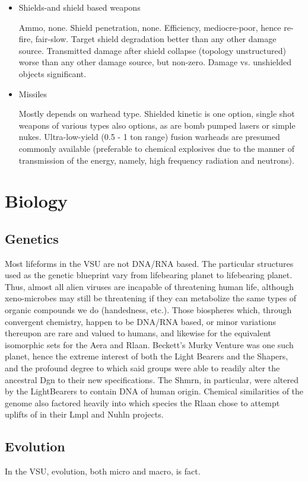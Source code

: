 \begin{itemize}
\item Shields-and shield based weapons

Ammo, none. Shield penetration, none. Efficiency, mediocre-poor, hence
re-fire, fair-slow. Target shield degradation better than any other
damage source. Transmitted damage after shield collapse (topology
unstructured) worse than any other damage source, but non-zero. Damage
vs. unshielded objects significant.

\item Missiles

Mostly depends on warhead type. Shielded kinetic is one option, single
shot weapons of various types also options, as are bomb pumped lasers
or simple nukes. Ultra-low-yield (0.5 - 1 ton range) fusion warheads
are presumed commonly available (preferable to chemical explosives due
to the manner of transmission of the energy, namely, high frequency
radiation and neutrons).
\end{itemize}

\section{Biology}
\label{sec:VSBiology}
\subsection{Genetics}
Most lifeforms in the VSU are not DNA/RNA based. The particular
structures used as the genetic blueprint vary from lifebearing planet
to lifebearing planet. Thus, almost all alien viruses are incapable of
threatening human life, although xeno-microbes may still be
threatening if they can metabolize the same types of organic compounds
we do (handedness, etc.). Those biospheres which, through convergent
chemistry, happen to be DNA/RNA based, or minor variations thereupon
are rare and valued to humans, and likewise for the equivalent
isomorphic sets for the Aera and Rlaan. Beckett's Murky Venture was
one such planet, hence the extreme interest of both the Light Bearers
and the Shapers, and the profound degree to which said groups were
able to readily alter the ancestral Dgn to their new
specifications. The Shmrn, in particular, were altered by the
LightBearers to contain DNA of human origin. Chemical similarities of
the genome also factored heavily into which species the Rlaan chose to
attempt uplifts of in their Lmpl and Nuhln projects.

\subsection{Evolution}

In the VSU, evolution, both micro and macro, is fact. 

